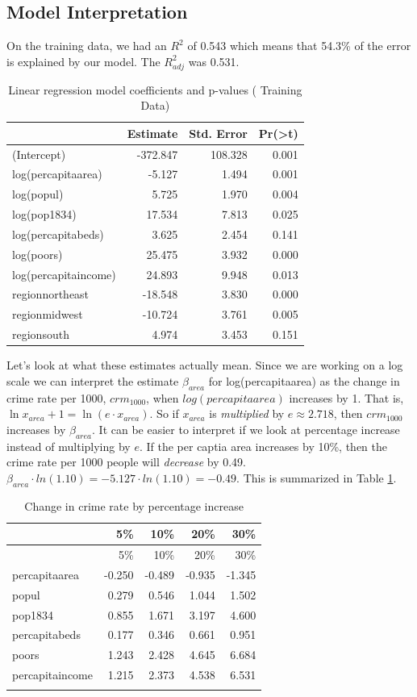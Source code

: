 \documentclass[]{article}
\begin{document}
\subsection{Model Interpretation}\label{model-interpretation}

On the training data, we had an \(R^2\) of 0.543 which means that 54.3\%
of the error is explained by our model. The \(R_{adj}^2\) was 0.531.

\begin{longtable}[h!]{@{}lrrr@{}}
\caption{Linear regression model coefficients and p-values ( Training Data)}\tabularnewline
\toprule
& Estimate & Std. Error &
Pr(\textgreater{}\textbar{}t\textbar{})\tabularnewline
\midrule
\endhead
(Intercept) & -372.847 & 108.328 & 0.001\tabularnewline
log(percapitaarea) & -5.127 & 1.494 & 0.001\tabularnewline
log(popul) & 5.725 & 1.970 & 0.004\tabularnewline
log(pop1834) & 17.534 & 7.813 & 0.025\tabularnewline
log(percapitabeds) & 3.625 & 2.454 & 0.141\tabularnewline
log(poors) & 25.475 & 3.932 & 0.000\tabularnewline
log(percapitaincome) & 24.893 & 9.948 & 0.013\tabularnewline
regionnortheast & -18.548 & 3.830 & 0.000\tabularnewline
regionmidwest & -10.724 & 3.761 & 0.005\tabularnewline
regionsouth & 4.974 & 3.453 & 0.151\tabularnewline
\bottomrule
\end{longtable}

Let's look at what these estimates actually mean. Since we are working
on a log scale we can interpret the estimate \(\beta_{area}\) for
log(percapitaarea) as the change in crime rate per 1000, \(crm_{1000}\),
when \(log(percapitaarea)\) increases by 1. That is,
\(\ln x_{area} + 1 = \ln(e \cdot x_{area})\). So if \(x_{area}\) is
\emph{multiplied} by \(e \approx 2.718\), then \(crm_{1000}\) increases
by \(\beta_{area}\). It can be easier to interpret if we look at
percentage increase instead of multiplying by \(e\). If the per captia
area increases by 10\%, then the crime rate per 1000 people will
\emph{decrease} by 0.49.
\(\beta_{area} \cdot ln(1.10) = -5.127 \cdot ln(1.10) = -0.49\). This is
summarized in Table \ref{table:crm_per_change}.

\newpage

\begin{longtable}[]{@{}lrrrr@{}}
\caption{Change in crime rate by percentage increase}\tabularnewline
\toprule
& 5\% & 10\% & 20\% & 30\%\tabularnewline
\midrule
\endfirsthead
\toprule
& 5\% & 10\% & 20\% & 30\%\tabularnewline
\midrule
\endhead
percapitaarea & -0.250 & -0.489 & -0.935 & -1.345\tabularnewline
popul & 0.279 & 0.546 & 1.044 & 1.502\tabularnewline
pop1834 & 0.855 & 1.671 & 3.197 & 4.600\tabularnewline
percapitabeds & 0.177 & 0.346 & 0.661 & 0.951\tabularnewline
poors & 1.243 & 2.428 & 4.645 & 6.684\tabularnewline
percapitaincome & 1.215 & 2.373 & 4.538 & 6.531\tabularnewline
\bottomrule
\label{table:crm_per_change}
\end{longtable}
\end{document}
